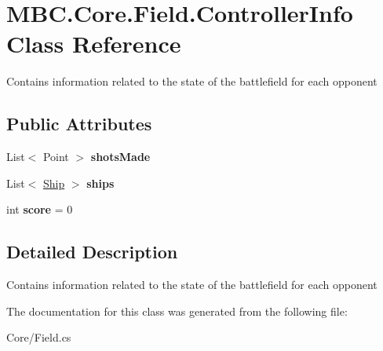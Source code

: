 \hypertarget{class_m_b_c_1_1_core_1_1_field_1_1_controller_info}{\section{M\-B\-C.\-Core.\-Field.\-Controller\-Info Class Reference}
\label{class_m_b_c_1_1_core_1_1_field_1_1_controller_info}
}


Contains information related to the state of the battlefield for each opponent 


\subsection*{Public Attributes}
\begin{DoxyCompactItemize}
\item 
\hypertarget{class_m_b_c_1_1_core_1_1_field_1_1_controller_info_a0e47d7ccd7030340d6b8cb7691bd3d93}{List$<$ Point $>$ {\bfseries shots\-Made}}\label{class_m_b_c_1_1_core_1_1_field_1_1_controller_info_a0e47d7ccd7030340d6b8cb7691bd3d93}

\item 
\hypertarget{class_m_b_c_1_1_core_1_1_field_1_1_controller_info_a6d69c3ee13b7f5779921afc37582d5e1}{List$<$ \hyperlink{class_m_b_c_1_1_core_1_1_ship}{Ship} $>$ {\bfseries ships}}\label{class_m_b_c_1_1_core_1_1_field_1_1_controller_info_a6d69c3ee13b7f5779921afc37582d5e1}

\item 
\hypertarget{class_m_b_c_1_1_core_1_1_field_1_1_controller_info_a04bdad238fa4cc5793a332019760d69f}{int {\bfseries score} = 0}\label{class_m_b_c_1_1_core_1_1_field_1_1_controller_info_a04bdad238fa4cc5793a332019760d69f}

\end{DoxyCompactItemize}


\subsection{Detailed Description}
Contains information related to the state of the battlefield for each opponent

The documentation for this class was generated from the following file\-:\begin{DoxyCompactItemize}
\item 
Core/Field.\-cs\end{DoxyCompactItemize}
